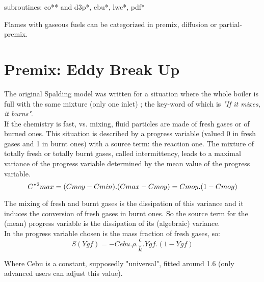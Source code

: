 {\huge subroutines: co** and d3p*, ebu*, lwc*, pdf*}

Flames with gaseous fuels can be categorized in premix, diffusion or
partial-premix.


\section{Premix: Eddy Break Up}

The original Spalding model \cite{1} was written for a situation where
the whole boiler is full with the same mixture ({\small only one
inlet}) ; the key-word of which is {\em"If it mixes, it burns"}.\\

If the chemistry is fast, vs. mixing, fluid particles are made of
fresh gases or of burned ones. This situation is described by a
progress variable ({\small valued 0 in fresh gases and 1 in burnt
ones}) with a source term: the reaction one. The mixture of totally
fresh or totally burnt gases, called intermittency, leads to a maximal
variance of the progress variable determined by the mean value of the
progress variable.\\
\begin{equation}
C"^{2} max = (Cmoy -Cmin).(Cmax-Cmoy) = Cmoy . (1-Cmoy)
\end{equation}


The mixing of fresh and burnt gases is the dissipation of this
variance and it induces the conversion of fresh gases in burnt
ones. So the source term for the ({\small mean}) progress variable is
the dissipation of its ({\small algebraic}) variance.\\

In \CS the progress variable chosen is the mass fraction of fresh
gases, so:\\
\begin{equation}
S(Ygf) = - Cebu . \rho . \frac{\epsilon}{k} . Ygf . (1-Ygf)
\end{equation}

Where Cebu is a constant, supposedly "universal", fitted around 1.6
({\small only advanced users can adjust this value}).\\


